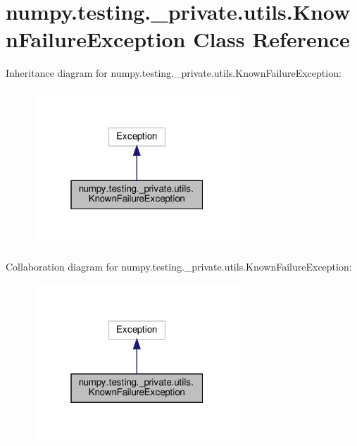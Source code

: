 \hypertarget{classnumpy_1_1testing_1_1__private_1_1utils_1_1KnownFailureException}{}\section{numpy.\+testing.\+\_\+private.\+utils.\+Known\+Failure\+Exception Class Reference}
\label{classnumpy_1_1testing_1_1__private_1_1utils_1_1KnownFailureException}


Inheritance diagram for numpy.\+testing.\+\_\+private.\+utils.\+Known\+Failure\+Exception\+:
\nopagebreak
\begin{figure}[H]
\begin{center}
\leavevmode
\includegraphics[width=220pt]{classnumpy_1_1testing_1_1__private_1_1utils_1_1KnownFailureException__inherit__graph}
\end{center}
\end{figure}


Collaboration diagram for numpy.\+testing.\+\_\+private.\+utils.\+Known\+Failure\+Exception\+:
\nopagebreak
\begin{figure}[H]
\begin{center}
\leavevmode
\includegraphics[width=220pt]{classnumpy_1_1testing_1_1__private_1_1utils_1_1KnownFailureException__coll__graph}
\end{center}
\end{figure}


